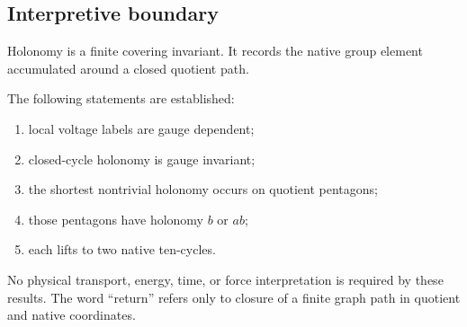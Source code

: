 \subsection{Interpretive boundary}

Holonomy is a finite covering invariant. It records the native
group element accumulated around a closed quotient path.

The following statements are established:

\begin{enumerate}
    \item local voltage labels are gauge dependent;
    \item closed-cycle holonomy is gauge invariant;
    \item the shortest nontrivial holonomy occurs on quotient
    pentagons;
    \item those pentagons have holonomy \(b\) or \(ab\);
    \item each lifts to two native ten-cycles.
\end{enumerate}

No physical transport, energy, time, or force interpretation is
required by these results. The word ``return'' refers only to closure
of a finite graph path in quotient and native coordinates.
